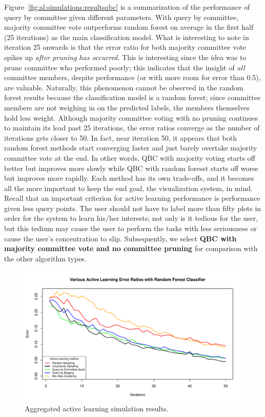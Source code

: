 Figure~\ref{fig:al:simulations:resultsqbc} is a summarization of the 
performance of query by committee given different parameters. With query by 
committee, majority committee vote outperforms random forest on 
average in the first half (25 iterations) as the main classification model. 
What is interesting to note in iteration 25 onwards is that the error ratio for 
both majority committee vote spikes up \textit{after pruning has occurred}. 
This is interesting since the idea was to prune committee who performed poorly; 
this indicates that the insight of \textit{all} committee members, 
despite performance (or with more room for error than 0.5), are valuable. 
Naturally, this phenomenon cannot be observed in the random forest results 
because the classification model is a random forest; since committee members 
are not weighing in on the predicted labels, the members themselves hold 
less weight. Although majority committee voting with no pruning 
continues to maintain its lead past 25 iterations, the error ratios converge as 
the number of iterations gets closer to 50. In fact, near iteration 50, it 
appears that both random forest methods start converging faster and just barely 
overtake majority committee vote at the end. In other words, QBC with majority 
voting starts off better but improves more slowly while QBC with random foresst 
starts off worse but improves more rapidly.
Each method has its own trade-offs, and it becomes all the more important to 
keep the end goal, the visualization system, in mind. Recall that an important 
criterion for active learning performance is performance given {less query
points}. The user should not have to label more than fifty plots in order for 
the system to learn his/her interests; not only is it tedious for the user, but 
this tedium may cause the user to perform the tasks with less seriousness or 
cause the user's concentration to slip. Subsequently, we select \textbf{QBC 
with majority committee vote and no committee pruning} for comparison with the 
other algorithm types.

\begin{figure}[htb]
	\begin{center}
		\includegraphics[width=1\linewidth,page=1]{ch-al/figures/results.pdf}
		\caption[Aggregated active learning simulation results.]{ 
		Aggregated active learning simulation results.}
		\label{fig:al:simulations:results}
	\end{center}
\end{figure}

